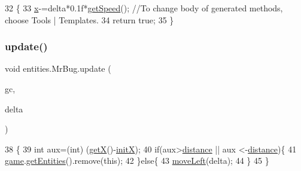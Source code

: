 \begin{DoxyCode}
32                                         \{
33         \mbox{\hyperlink{classorg_1_1newdawn_1_1slick_1_1geom_1_1_shape_a3e985bfff386c15a4efaad03d8ad60d3}{x}}-=delta*0.1f*\mbox{\hyperlink{classentities_1_1_mobile_entity_a21020e5f09194aae693dbce8d7d59ffa}{getSpeed}}(); \textcolor{comment}{//To change body of generated methods, choose Tools | Templates.}
34         \textcolor{keywordflow}{return} \textcolor{keyword}{true};
35     \}
\end{DoxyCode}
\mbox{\label{classentities_1_1_mr_bug_a5edd24b13e3ffd6eac09f8bfac9d5c8d}} 
\subsubsection{\texorpdfstring{update()}{update()}}
{\footnotesize\ttfamily void entities.\+Mr\+Bug.\+update (\begin{DoxyParamCaption}\item[{\mbox{\hyperlink{classorg_1_1newdawn_1_1slick_1_1_game_container}{Game\+Container}}}]{gc,  }\item[{long}]{delta }\end{DoxyParamCaption})\hspace{0.3cm}{\ttfamily [inline]}}


\begin{DoxyCode}
38                                                      \{
39         \textcolor{keywordtype}{int} aux=(int) (\mbox{\hyperlink{classorg_1_1newdawn_1_1slick_1_1geom_1_1_shape_a736a47bfdd6f164558b43fd497a3a3f3}{getX}}()-\mbox{\hyperlink{classentities_1_1_mr_bug_ab378361709f903878b74eb06b4d84229}{initX}});
40         \textcolor{keywordflow}{if}(aux>\mbox{\hyperlink{classentities_1_1_mr_bug_ac1294909619da53941cf37073936daba}{distance}} || aux <-\mbox{\hyperlink{classentities_1_1_mr_bug_ac1294909619da53941cf37073936daba}{distance}})\{
41             \mbox{\hyperlink{classentities_1_1_mr_bug_a02458a7ed258fc3f99a097cf95bc036e}{game}}.\mbox{\hyperlink{classstates_1_1_game_state_ac441d850526544e548921068f5eb78d6}{getEntities}}().remove(\textcolor{keyword}{this});
42         \}\textcolor{keywordflow}{else}\{
43             \mbox{\hyperlink{classentities_1_1_mr_bug_ae1876c75b237e09d38c1e71d6d934685}{moveLeft}}(delta);
44         \}
45     \}
\end{DoxyCode}


